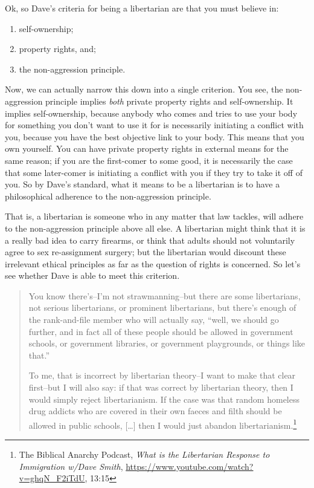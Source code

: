 \documentclass[11pt]{article}
\begin{document}
Ok, so Dave's criteria for being a libertarian are that you must believe in:
\begin{enumerate}
\item self-ownership;
\item property rights, and;
\item the non-aggression principle.
\end{enumerate}

Now, we can actually narrow this down into a single criterion. You see, the non-aggression principle implies \emph{both} private property rights and self-ownership. It implies self-ownership, because anybody who comes and tries to use your body for something you don't want to use it for is necessarily initiating a conflict with you, because you have the best objective link to your body. This means that you own yourself. You can have private property rights in external means for the same reason; if you are the first-comer to some good, it is necessarily the case that some later-comer is initiating a conflict with you if they try to take it off of you. So by Dave's standard, what it means to be a libertarian is to have a philosophical adherence to the non-aggression principle.

That is, a libertarian is someone who in any matter that law tackles, will adhere to the non-aggression principle above all else. A libertarian might think that it is a really bad idea to carry firearms, or think that adults should not voluntarily agree to sex re-assignment surgery; but the libertarian would discount these irrelevant ethical principles as far as the question of rights is concerned. So let's see whether Dave is able to meet this criterion.

\begin{quote}
You know there's--I'm not strawmanning--but there are some libertarians, not serious libertarians, or prominent libertarians, but there's enough of the rank-and-file member who will actually say, ``well, we should go further, and in fact all of these people should be allowed in government schools, or government libraries, or government playgrounds, or things like that.''

To me, that is incorrect by libertarian theory--I want to make that clear first--but I will also say: if that was correct by libertarian theory, then I would simply reject libertarianism. If the case was that random homeless drug addicts who are covered in their own faeces and filth should be allowed in public schools, [\ldots{}] then I would just abandon libertarianism.\footnote{The Biblical Anarchy Podcast, \emph{What is the Libertarian Response to Immigration w/Dave Smith}, \url{https://www.youtube.com/watch?v=ghqN\_F2iTdU}, 13:15}
\end{quote}
\end{document}
